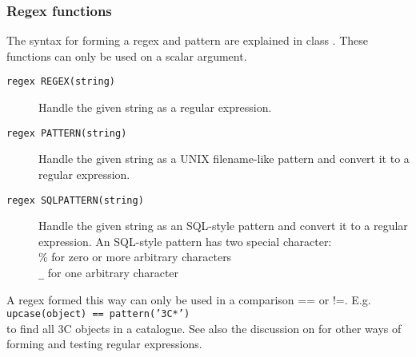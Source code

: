 \subsubsection{Regex functions}
The syntax for forming a regex and pattern are explained in class
.
These functions can only be used on a scalar argument.

\begin{description}
  \item[ \texttt{regex REGEX(string)}]
       Handle the given string as a regular expression.
  \item[ \texttt{regex PATTERN(string)}]
       Handle the given string as a UNIX filename-like pattern and
       convert it to a regular expression.
  \item[ \texttt{regex SQLPATTERN(string)}]
       Handle the given string as an SQL-style pattern and
       convert it to a regular expression.
       An SQL-style pattern has two special character:
       \\ \% for zero or more arbitrary characters
       \\ \verb+_+ for one arbitrary character
\end{description}
A regex formed this way can only be used in a comparison == or !=. E.g.
\\\texttt{upcase(object) == pattern('3C*')}
\\to find all 3C objects in a catalogue.
See also the discussion on  for
other ways of forming and testing regular expressions.

